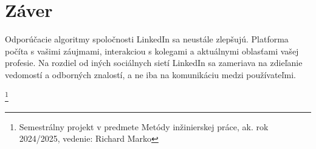 \documentclass[twoside,slovak,a4paper]{coursepaper}
\begin{document}







 


\section{Záver} \label{zaver}
Odporúčacie algoritmy spoločnosti LinkedIn sa neustále zlepšujú. Platforma počíta s vašimi záujmami, interakciou s kolegami a aktuálnymi oblasťami vašej profesie. Na rozdiel od iných sociálnych sietí LinkedIn sa zameriava na zdieľanie vedomostí a odborných znalostí, a ne iba na komunikáciu medzi používateľmi.

\thanks{Semestrálny projekt v predmete Metódy inžinierskej práce, ak. rok 2024/2025, vedenie: Richard Marko}


 
\end{document}
